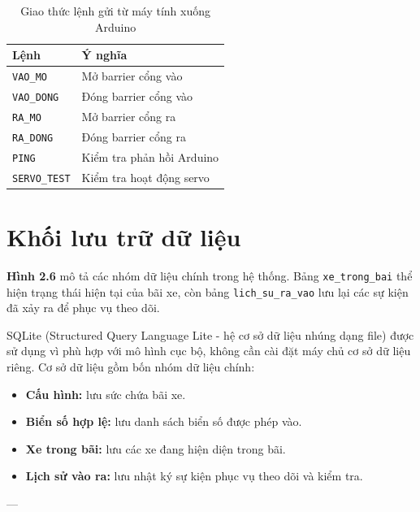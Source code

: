 \documentclass[a4paper,14pt]{extreport}
\begin{document}
\begin{table}[H]
\centering
\caption{Giao thức lệnh gửi từ máy tính xuống Arduino}
\label{tab:giao_thuc}
\begin{tabular}{ll}
\toprule
\textbf{Lệnh} & \textbf{Ý nghĩa} \\
\midrule
\texttt{VAO\_MO} & Mở barrier cổng vào \\
\texttt{VAO\_DONG} & Đóng barrier cổng vào \\
\texttt{RA\_MO} & Mở barrier cổng ra \\
\texttt{RA\_DONG} & Đóng barrier cổng ra \\
\texttt{PING} & Kiểm tra phản hồi Arduino \\
\texttt{SERVO\_TEST} & Kiểm tra hoạt động servo \\
\bottomrule
\end{tabular}
\end{table}

\section{Khối lưu trữ dữ liệu}

\textbf{Hình 2.6} mô tả các nhóm dữ liệu chính trong hệ thống. Bảng \texttt{xe\_trong\_bai} thể hiện trạng thái hiện tại của bãi xe, còn bảng \texttt{lich\_su\_ra\_vao} lưu lại các sự kiện đã xảy ra để phục vụ theo dõi.

SQLite (Structured Query Language Lite - hệ cơ sở dữ liệu nhúng dạng file) được sử dụng vì phù hợp với mô hình cục bộ, không cần cài đặt máy chủ cơ sở dữ liệu riêng. Cơ sở dữ liệu gồm bốn nhóm dữ liệu chính:

\begin{itemize}[leftmargin=2em]
  \item \textbf{Cấu hình:} lưu sức chứa bãi xe.
  \item \textbf{Biển số hợp lệ:} lưu danh sách biển số được phép vào.
  \item \textbf{Xe trong bãi:} lưu các xe đang hiện diện trong bãi.
  \item \textbf{Lịch sử vào ra:} lưu nhật ký sự kiện phục vụ theo dõi và kiểm tra.
\end{itemize}
---
\end{document}
